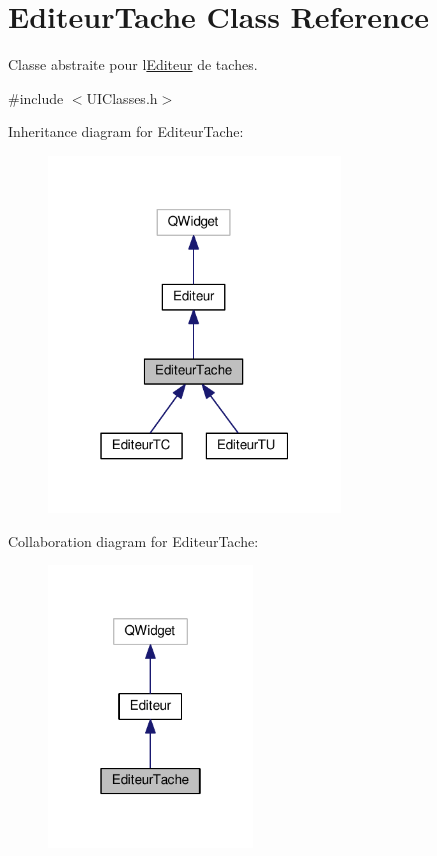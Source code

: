 \hypertarget{class_editeur_tache}{}\section{Editeur\+Tache Class Reference}
\label{class_editeur_tache}


Classe abstraite pour l\textquotesingle{}\hyperlink{class_editeur}{Editeur} de taches.  




{\ttfamily \#include $<$U\+I\+Classes.\+h$>$}



Inheritance diagram for Editeur\+Tache\+:\nopagebreak
\begin{figure}[H]
\begin{center}
\leavevmode
\includegraphics[width=220pt]{class_editeur_tache__inherit__graph}
\end{center}
\end{figure}


Collaboration diagram for Editeur\+Tache\+:\nopagebreak
\begin{figure}[H]
\begin{center}
\leavevmode
\includegraphics[width=154pt]{class_editeur_tache__coll__graph}
\end{center}
\end{figure}
